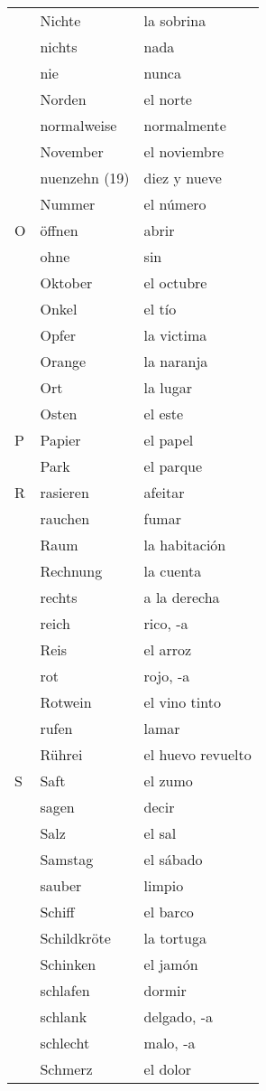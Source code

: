 \documentclass[10pt,spanish]{article}
\begin{document}
\begin{longtable}{p{} p{} | p{}}
& Nichte & la sobrina  \\
& nichts & nada \\
& nie & nunca  \\
& Norden & el norte  \\
& normalweise & normalmente \\
& November & el noviembre  \\
& nuenzehn (19) & diez y nueve  \\
& Nummer & el número  \\
O & öffnen & abrir  \\
& ohne & sin  \\
& Oktober & el octubre  \\
& Onkel & el tío  \\
& Opfer & la victima \\
& Orange & la naranja  \\
& Ort & la lugar  \\
& Osten & el este  \\
P & Papier & el papel  \\
& Park & el parque  \\
R & rasieren & afeitar \\
& rauchen & fumar  \\
& Raum & la habitación  \\
& Rechnung & la cuenta  \\
& rechts & a la derecha \\
& reich & rico, -a  \\
& Reis & el arroz  \\
& rot & rojo, -a  \\
& Rotwein & el vino tinto  \\
& rufen & lamar  \\
& Rührei & el huevo revuelto\\
S & Saft & el zumo  \\
& sagen & decir  \\
& Salz & el sal  \\
& Samstag & el sábado  \\
& sauber & limpio  \\
& Schiff & el barco  \\
& Schildkröte & la tortuga  \\
& Schinken & el jamón \\
& schlafen & dormir  \\
& schlank & delgado, -a \\
& schlecht & malo, -a \\
& Schmerz & el dolor  \\

\end{longtable}
\end{document}
